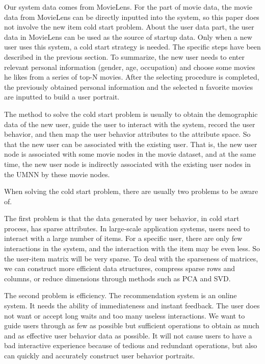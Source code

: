 \par Our system data comes from MovieLens. For the part of movie data, the movie data from MovieLens can be directly inputted into the system, so this paper does not involve the new item cold start problem. About the user data part, the user data in MovieLens can be used as the source of startup data. Only when a new user uses this system, a cold start strategy is needed. The specific steps have been described in the previous section. To summarize, the new user needs to enter relevant personal information (gender, age, occupation) and choose some movies he likes from a series of top-N movies. After the selecting procedure is completed, the previously obtained personal information and the selected n favorite movies are inputted to build a user portrait.
\par The method to solve the cold start problem is usually to obtain the demographic data of the new user, guide the user to interact with the system, record the user behavior, and then map the user behavior attributes to the attribute space. So that the new user can be associated with the existing user. That is, the new user node is associated with some movie nodes in the movie dataset, and at the same time, the new user node is indirectly associated with the existing user nodes in the UMNN by these movie nodes.
\par When solving the cold start problem, there are usually two problems to be aware of.
\par The first problem is that the data generated by user behavior, in cold start process, has sparse attributes. In large-scale application systems, users need to interact with a large number of items. For a specific user, there are only few interactions in the system, and the interaction with the item may be even less. So the user-item matrix will be very sparse. To deal with the sparseness of matrices, we can construct more efficient data structures, compress sparse rows and columns, or reduce dimensions through methods such as PCA and SVD.
\par The second problem is efficiency. The recommendation system is an online system. It needs the ability of immediateness and instant feedback. The user does not want or accept long waits and too many useless interactions. We want to guide users through as few as possible but sufficient operations to obtain as much and as effective user behavior data as possible. It will not cause users to have a bad interactive experience because of tedious and redundant operations, but also can quickly and accurately construct user behavior portraits.

